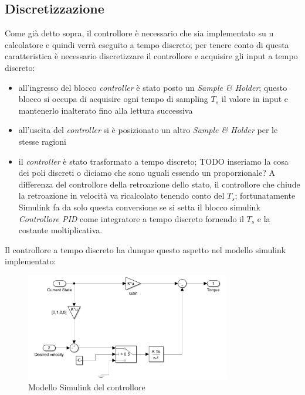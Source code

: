 \subsection{Discretizzazione}
Come già detto sopra, il controllore è necessario che sia implementato su u calcolatore e quindi verrà eseguito a tempo discreto; per tenere conto di questa caratteristica è necessario discretizzare il controllore e acquisire gli input a tempo discreto:
\begin{itemize}
	\item all'ingresso del blocco \textit{controller} è stato posto un \textit{Sample \& Holder}; questo blocco si occupa di acquisire ogni tempo di sampling $T_s$ il valore in input e mantenerlo inalterato fino alla lettura successiva
	\item all'uscita del \textit{controller} si è posizionato un altro \textit{Sample \& Holder} per le stesse ragioni
	\item il \textit{controller} è stato trasformato a tempo discreto; TODO inseriamo la cosa dei poli discreti o diciamo che sono uguali essendo un proporzionale?
	A differenza del controllore della retroazione dello stato, il controllore che chiude la retroazione in velocità va ricalcolato tenendo conto del $T_s$; fortunatamente Simulink fa da solo questa conversione se si setta il blocco simulink \textit{Controllore PID} come integratore a tempo discreto fornendo il $T_s$ e la costante moltiplicativa.
\end{itemize}
Il controllore a tempo discreto ha dunque questo aspetto nel modello simulink implementato:
\begin{figure}[H]
	\centering   	
	\includegraphics[width=0.8\textwidth]{Immagini/controller_discrete.png}
	\caption{Modello Simulink del controllore}
	\label{fig:controller_discrete}
\end{figure}